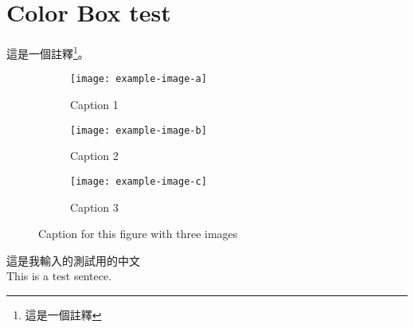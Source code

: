 \documentclass[12pt, oneside]{book}
\begin{document}
\section{Color Box test}
\thm{}{}
這是一個註釋\footnote{這是一個註釋}。

\begin{figure}[H]
	\centering
	\begin{subfigure}{0.3\textwidth}
		\centering
		\texttt{[image: example-image-a]}
		\caption{Caption 1}
		\label{fig:sub1}
	\end{subfigure}
	\begin{subfigure}{0.3\textwidth}
		\centering
		\texttt{[image: example-image-b]}
		\caption{Caption 2}
		\label{fig:sub2}
	\end{subfigure}
	\begin{subfigure}{0.3\textwidth}
		\centering
		\texttt{[image: example-image-c]}
		\caption{Caption 3}
		\label{fig:sub3}
	\end{subfigure}
	\caption{Caption for this figure with three images}
	\label{fig:image3}
\end{figure}

這是我輸入的測試用的中文\\
This is a test sentece.

\nocite{*}


\end{document}
